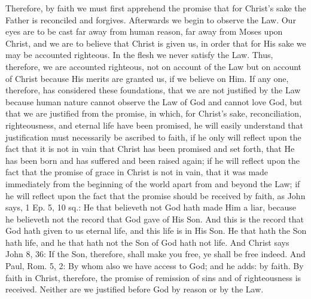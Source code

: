 Therefore, by faith we must first apprehend the promise that for
Christ's sake the Father is reconciled and forgives.  Afterwards we
begin to observe the Law.  Our eyes are to be cast far away from
human reason, far away from Moses upon Christ, and we are to believe
that Christ is given us, in order that for His sake we may be
accounted righteous.  In the flesh we never satisfy the Law.  Thus,
therefore, we are accounted righteous, not on account of the Law but
on account of Christ because His merits are granted us, if we believe
on Him.  If any one, therefore, has considered these foundations,
that we are not justified by the Law because human nature cannot
observe the Law of God and cannot love God, but that we are justified
from the promise, in which, for Christ's sake, reconciliation,
righteousness, and eternal life have been promised, he will easily
understand that justification must necessarily be ascribed to faith,
if he only will reflect upon the fact that it is not in vain that
Christ has been promised and set forth, that He has been born and has
suffered and been raised again; if he will reflect upon the fact that
the promise of grace in Christ is not in vain, that it was made
immediately from the beginning of the world apart from and beyond the
Law; if he will reflect upon the fact that the promise should be
received by faith, as John says, 1 Ep. 5, 10 sq.: He that believeth
not God hath made Him a liar, because he believeth not the record
that God gave of His Son.  And this is the record that God hath given
to us eternal life, and this life is in His Son.  He that hath the
Son hath life, and he that hath not the Son of God hath not life.
And Christ says John 8, 36: If the Son, therefore, shall make you
free, ye shall be free indeed.  And Paul, Rom. 5, 2: By whom also we
have access to God; and he adds: by faith.  By faith in Christ,
therefore, the promise of remission of sins and of righteousness is
received.  Neither are we justified before God by reason or by the
Law.


